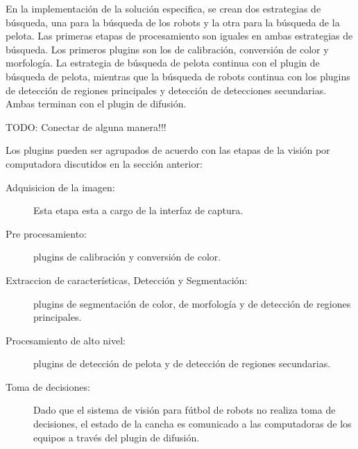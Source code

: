 En la implementación de la solución especifica, se crean dos estrategias de
búsqueda, una para la búsqueda de los robots y la otra para la búsqueda de la
pelota. Las primeras etapas de procesamiento son iguales en ambas estrategias de
búsqueda. Los primeros plugins son los de calibración, conversión de
color y morfología. La estrategia de búsqueda de pelota continua con el
plugin de búsqueda de pelota, mientras que la búsqueda de robots continua
con los plugins de detección de regiones principales y detección de
detecciones secundarias. Ambas terminan con el plugin de difusión.

TODO: Conectar de alguna manera!!!

Los plugins pueden ser agrupados de acuerdo con las etapas de la visión
por computadora discutidos en la sección anterior:

\begin{description}

\item[Adquisicion de la imagen:] Esta etapa esta a cargo de la interfaz de
	captura.

\item[Pre procesamiento:] plugins de calibración y conversión de color.

\item[Extraccion de características, Detección y Segmentación:] plugins
	de segmentación de color, de morfología y de detección de regiones
	principales.

\item[Procesamiento de alto nivel:] plugins de detección de pelota y de
	detección de regiones secundarias.

\item[Toma de decisiones:] Dado que el sistema de visión para fútbol de robots
	no realiza toma de decisiones, el estado de la cancha es comunicado a
	las computadoras de los equipos a través del plugin de difusión.

\end{description}
